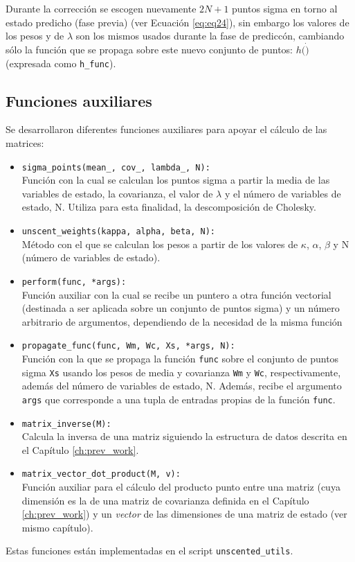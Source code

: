 Durante la correcci\'on se escogen nuevamente $2N+1$ puntos sigma en torno al estado predicho (fase previa) (ver Ecuaci\'on \ref{eq:eq24}), sin embargo los valores de los pesos y de $\lambda$ son los mismos usados durante la fase de predicc\'on, cambiando s\'olo la funci\'on que se propaga sobre este nuevo conjunto de puntos: $h(\dot)$ (expresada como \texttt{h\_func}). 
\bigskip

\subsection{Funciones auxiliares}
Se desarrollaron diferentes funciones auxiliares para apoyar el c\'alculo de las matrices:
\begin{itemize}
\item \texttt{sigma\_points(mean\_, cov\_, lambda\_, N):}\\
Funci\'on con la cual se calculan los puntos sigma a partir la media de las variables de estado, la covarianza, el valor de $\lambda$ y el n\'umero de variables de estado, N. Utiliza para esta finalidad, la descomposici\'on de Cholesky.
\item \texttt{unscent\_weights(kappa, alpha, beta, N):}\\
M\'etodo con el que se calculan los pesos a partir de los valores de $\kappa$, $\alpha$, $\beta$ y N (n\'umero de variables de estado). 
\item \texttt{perform(func, *args):}\\
Funci\'on auxiliar con la cual se recibe un puntero a otra funci\'on vectorial (destinada a ser aplicada sobre un conjunto de puntos sigma) y un n\'umero arbitrario de argumentos, dependiendo de la necesidad de la misma funci\'on
\item \texttt{propagate\_func(func, Wm, Wc, Xs, *args, N):}\\
Funci\'on con la que se propaga la funci\'on \texttt{func} sobre el conjunto de puntos sigma \texttt{Xs} usando los pesos de media y covarianza \texttt{Wm} y \texttt{Wc}, respectivamente, adem\'as del n\'umero de variables de estado, N. Adem\'as, recibe el argumento \texttt{args} que corresponde a una tupla de entradas propias de la funci\'on \texttt{func}.  
\item \texttt{matrix\_inverse(M):}\\
Calcula la inversa de una matriz siguiendo la estructura de datos descrita en el Cap\'itulo \ref{ch:prev_work}.
\item \texttt{matrix\_vector\_dot\_product(M, v):}\\
Funci\'on auxiliar para el c\'alculo del producto punto entre una matriz (cuya dimensi\'on es la de una matriz de covarianza definida en el Cap\'itulo \ref{ch:prev_work}) y un \textit{vector} de las dimensiones de una matriz de estado (ver mismo cap\'itulo).
\end{itemize}

Estas funciones est\'an implementadas en el script \texttt{unscented\_utils}.
